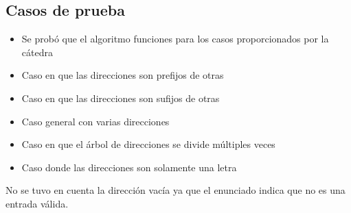\subsection{Casos de prueba}

\begin{itemize}
\item Se probó que el algoritmo funciones para los casos proporcionados por
la cátedra
\item Caso en que las direcciones son prefijos de otras
\item Caso en que las direcciones son sufijos de otras
\item Caso general con varias direcciones
\item Caso en que el árbol de direcciones se divide múltiples veces
\item Caso donde las direcciones son solamente una letra
\end{itemize}

No se tuvo en cuenta la dirección vacía ya que el enunciado indica que no es
una entrada válida.
